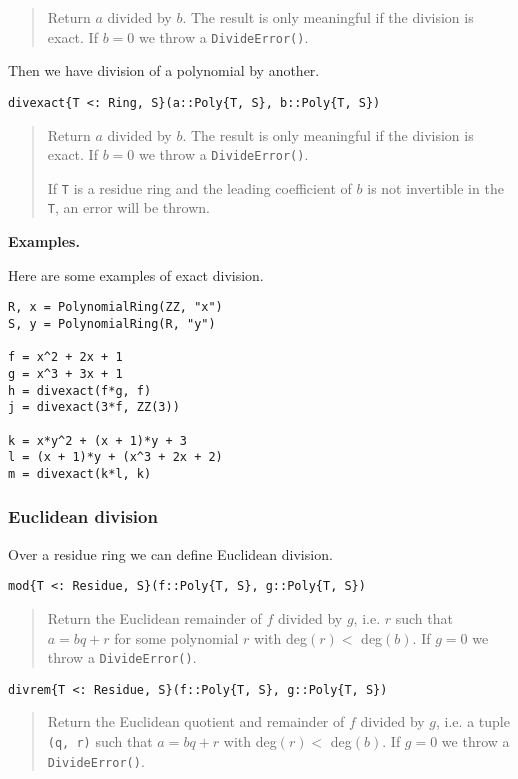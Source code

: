 \documentclass[a4paper,10pt]{article}
\newcommand{\code}{\lstinline}
\newcommand{\desc}[1]{\vspace{-3mm}\begin{quote}#1\end{quote}}
\begin{document}
{{{\desc{Return $a$ divided by $b$. The result is only meaningful if the division is
exact. If $b = 0$ we throw a \code{DivideError()}.}

Then we have division of a polynomial by another.

\begin{lstlisting}
divexact{T <: Ring, S}(a::Poly{T, S}, b::Poly{T, S})
\end{lstlisting}

\desc{Return $a$ divided by $b$. The result is only meaningful if the division is
exact. If $b = 0$ we throw a \code{DivideError()}. 

If \code{T} is a residue ring and the leading coefficient of $b$ is not invertible
in the \code{T}, an error will be thrown.} 

\textbf{Examples.}

Here are some examples of exact division.

\begin{lstlisting}
R, x = PolynomialRing(ZZ, "x")
S, y = PolynomialRing(R, "y")

f = x^2 + 2x + 1
g = x^3 + 3x + 1
h = divexact(f*g, f)
j = divexact(3*f, ZZ(3))

k = x*y^2 + (x + 1)*y + 3
l = (x + 1)*y + (x^3 + 2x + 2)
m = divexact(k*l, k)
\end{lstlisting}

\subsubsection{Euclidean division}

Over a residue ring we can define Euclidean division.

\begin{lstlisting}
mod{T <: Residue, S}(f::Poly{T, S}, g::Poly{T, S})
\end{lstlisting}

\desc{Return the Euclidean remainder of $f$ divided by $g$, i.e. $r$ such 
that $a = bq + r$ for some polynomial $r$ with deg$(r) <$ deg$(b)$. If 
$g = 0$ we throw a \code{DivideError()}.}

\begin{lstlisting}
divrem{T <: Residue, S}(f::Poly{T, S}, g::Poly{T, S})
\end{lstlisting}

\desc{Return the Euclidean quotient and remainder of $f$ divided by $g$, i.e.
a tuple \code{(q, r)} such that $a = bq + r$ with deg$(r) <$ deg$(b)$. If 
$g = 0$ we throw a \code{DivideError()}.}

}}}
\end{document}
